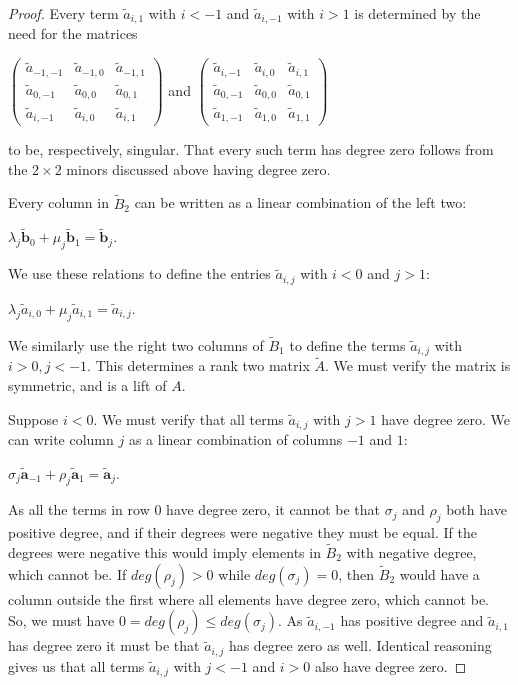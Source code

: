 \documentclass{article}
\begin{document}
\begin{proof}
  Every term $\tilde{a}_{i,1}$ with $i < -1$ and $\tilde{a}_{i,-1}$ with $i > 1$ is determined by the need for the matrices
  \begin{center}
    $\left(\begin{array}{ccc} \tilde{a}_{-1,-1} & \tilde{a}_{-1,0} & \tilde{a}_{-1,1} \\ \tilde{a}_{0,-1} & \tilde{a}_{0,0} & \tilde{a}_{0,1} \\ \tilde{a}_{i,-1} & \tilde{a}_{i,0} & \tilde{a}_{i,1} \end{array}\right)$ \hspace{.1 in} and \hspace{.1 in} $\left(\begin{array}{ccc} \tilde{a}_{i,-1} & \tilde{a}_{i,0} & \tilde{a}_{i,1} \\ \tilde{a}_{0,-1} & \tilde{a}_{0,0} & \tilde{a}_{0,1} \\ \tilde{a}_{1,-1} & \tilde{a}_{1,0} & \tilde{a}_{1,1} \end{array}\right)$  
  \end{center} 
  to be, respectively, singular. That every such term has degree zero follows from the $2 \times 2$ minors discussed above having degree zero.
  
  Every column in $\tilde{B}_{2}$ can be written as a linear combination of the left two: 
  \begin{center}
    $\lambda_{j} \tilde{\textbf{b}}_{0} + \mu_{j} \tilde{\textbf{b}}_{1} = \tilde{\textbf{b}}_{j}$.
  \end{center}
  We use these relations to define the entries $\tilde{a}_{i,j}$ with $i < 0$ and $j > 1$:  
  \begin{center}
    $\lambda_{j} \tilde{a}_{i,0} + \mu_{j} \tilde{a}_{i,1} = \tilde{a}_{i,j}$.
  \end{center}  
  We similarly use the right two columns of $\tilde{B}_{1}$ to define the terms $\tilde{a}_{i,j}$ with $i > 0, j < -1$. This determines a rank two matrix $\tilde{A}$. We must verify the matrix is symmetric, and is a lift of $A$.
  
  Suppose $i < 0$. We must verify that all terms $\tilde{a}_{i,j}$ with $j > 1$ have degree zero. We can write column $j$ as a linear combination of columns $-1$ and $1$:
  \begin{center}
    $\sigma_{j}\tilde{\textbf{a}}_{-1} + \rho_{j}\tilde{\textbf{a}}_{1} = \tilde{\textbf{a}}_{j}$.
  \end{center}
  As all the terms in row $0$ have degree zero, it cannot be that $\sigma_{j}$ and $\rho_{j}$ both have positive degree, and if their degrees were negative they must be equal. If the degrees were negative this would imply elements in $\tilde{B}_{2}$ with negative degree, which cannot be. If $deg(\rho_{j}) > 0$ while $deg(\sigma_{j}) = 0$, then $\tilde{B}_{2}$ would have a column outside the first where all elements have degree zero, which cannot be. So, we must have $0 = deg(\rho_{j}) \leq deg(\sigma_{j})$. As $\tilde{a}_{i,-1}$ has positive degree and $\tilde{a}_{i,1}$ has degree zero it must be that $\tilde{a}_{i,j}$ has degree zero as well. Identical reasoning gives us that all terms $\tilde{a}_{i,j}$ with $j < -1$ and $i > 0$ also have degree zero.    
  

\end{proof}
\end{document}
